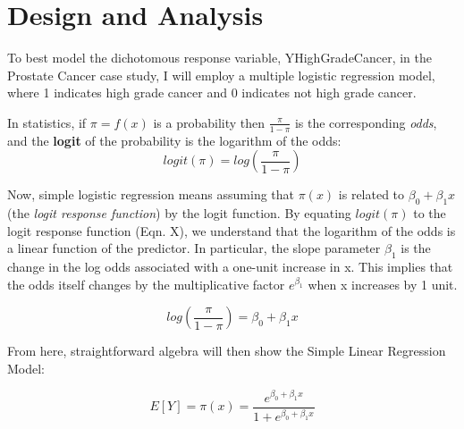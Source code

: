 %
%
%

\section{Design and Analysis}
To best model the dichotomous response variable, Y\textunderscore HighGradeCancer, in the Prostate Cancer case study, I will employ a multiple logistic regression model, where 1 indicates high grade cancer and 0 indicates not high grade cancer. \par

In statistics, if \(\pi = f(x)\) is a probability then \(\frac{\pi}{1-\pi}\) is the corresponding \textit{odds}, and the \textbf{logit} of the probability is the logarithm of the odds:
\begin{equation}
	logit(\pi) = log(\frac{\pi}{1-\pi})
\end{equation}


Now, simple logistic regression means assuming that \(\pi(x)\) is related to \(\beta_0 + \beta_1x\) (the \textit{logit response function}) by the logit function. By equating \(logit(\pi)\) to the logit response function (Eqn. X), we understand that the logarithm of the odds is a linear function of the predictor. In particular, the slope parameter \(\beta_1\) is the change in the log odds associated with a one-unit increase in x. This implies that the odds itself changes by the multiplicative factor \(e^{\beta_1}\) when x increases by 1 unit.

\begin{equation}
	log(\frac{\pi}{1-\pi}) = \beta_0 + \beta_1x
\end{equation}

From here, straightforward algebra will then show the Simple Linear Regression Model:

\begin{equation}
	E[Y] = \pi(x) = \frac{e^{\beta_0 + \beta_1x}}{1+e^{\beta_0 + \beta_1x}}
\end{equation}

 \par

